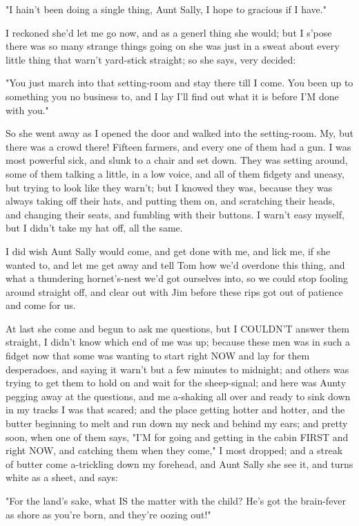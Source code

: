 "I hain't been doing a single thing, Aunt Sally, I hope to gracious if I
have."

I reckoned she'd let me go now, and as a generl thing she would; but I
s'pose there was so many strange things going on she was just in a sweat
about every little thing that warn't yard-stick straight; so she says,
very decided:

"You just march into that setting-room and stay there till I come.  You
been up to something you no business to, and I lay I'll find out what it
is before I'M done with you."

So she went away as I opened the door and walked into the setting-room.
My, but there was a crowd there!  Fifteen farmers, and every one of them
had a gun.  I was most powerful sick, and slunk to a chair and set down.
They was setting around, some of them talking a little, in a low voice,
and all of them fidgety and uneasy, but trying to look like they warn't;
but I knowed they was, because they was always taking off their hats, and
putting them on, and scratching their heads, and changing their seats,
and fumbling with their buttons.  I warn't easy myself, but I didn't take
my hat off, all the same.

I did wish Aunt Sally would come, and get done with me, and lick me, if
she wanted to, and let me get away and tell Tom how we'd overdone this
thing, and what a thundering hornet's-nest we'd got ourselves into, so we
could stop fooling around straight off, and clear out with Jim before
these rips got out of patience and come for us.

At last she come and begun to ask me questions, but I COULDN'T answer
them straight, I didn't know which end of me was up; because these men
was in such a fidget now that some was wanting to start right NOW and lay
for them desperadoes, and saying it warn't but a few minutes to midnight;
and others was trying to get them to hold on and wait for the
sheep-signal; and here was Aunty pegging away at the questions, and me
a-shaking all over and ready to sink down in my tracks I was that scared;
and the place getting hotter and hotter, and the butter beginning to melt
and run down my neck and behind my ears; and pretty soon, when one of
them says, "I'M for going and getting in the cabin FIRST and right NOW,
and catching them when they come," I most dropped; and a streak of butter
come a-trickling down my forehead, and Aunt Sally she see it, and turns
white as a sheet, and says:

"For the land's sake, what IS the matter with the child?  He's got the
brain-fever as shore as you're born, and they're oozing out!"

